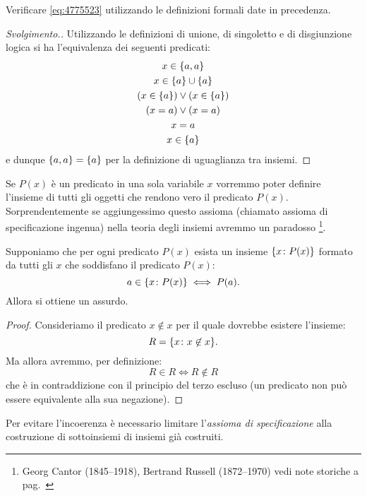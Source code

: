 \begin{exercise}
  Verificare \eqref{eq:4775523} utilizzando le definizioni formali date in precedenza.
\end{exercise}
\begin{proof}[Svolgimento.]
Utilizzando le definizioni di unione, di singoletto e di disgiunzione logica
si ha l'equivalenza dei seguenti
predicati:
\begin{gather*}
  x \in {\left\{ a,a \right\}}  \\
  x \in {\left\{ a \right\}} \cup {\left\{ a \right\}}\\
  (x \in {\left\{ a \right\}}) \lor (x \in {\left\{ a \right\}})\\
  (x = a) \lor (x = a) \\
  x = a \\
  x \in {\left\{ a \right\}}
\end{gather*}
e dunque ${\left\{ a,a \right\}}={\left\{ a \right\}}$ per la definizione di uguaglianza tra insiemi.
\end{proof}

Se $P(x)$ è un predicato in una sola variabile $x$ vorremmo poter
definire l'insieme di tutti gli oggetti che rendono vero il predicato $P(x)$.
Sorprendentemente se aggiungessimo questo assioma 
(chiamato assioma di specificazione ingenua) nella teoria degli insiemi
avremmo un paradosso%
%
%
%
%
%
\footnote{Georg Cantor (1845--1918), Bertrand Russell (1872--1970) 
vedi note storiche a pag.~\pageref{nota:Cantor}}.

\begin{theorem}
\label{th:Russell}%
Supponiamo che per ogni predicato $P(x)$ esista un insieme 
${\left\{ x\colon P(x) \right\}}$ formato da tutti gli $x$ 
che soddisfano il predicato $P(x)$:
\[
  a \in {\left\{ x\colon P(x) \right\}} \iff P(a).
\]
Allora si ottiene un assurdo.
\end{theorem}
%
\begin{proof}
  Consideriamo il predicato $x \not \in x$
  per il quale dovrebbe esistere l'insieme:
  \[
    R = {\left\{ x\colon x\not \in x \right\}}.  
  \]
  Ma allora avremmo, per definizione:
  \[
    R \in R 
    \iff R\not \in R
  \]
  che è in contraddizione con il principio del terzo escluso
  (un predicato non può essere equivalente alla sua negazione).
\end{proof}

Per evitare l'incoerenza è necessario limitare l'\emph{assioma di specificazione}
alla costruzione di sottoinsiemi di insiemi già costruiti.


